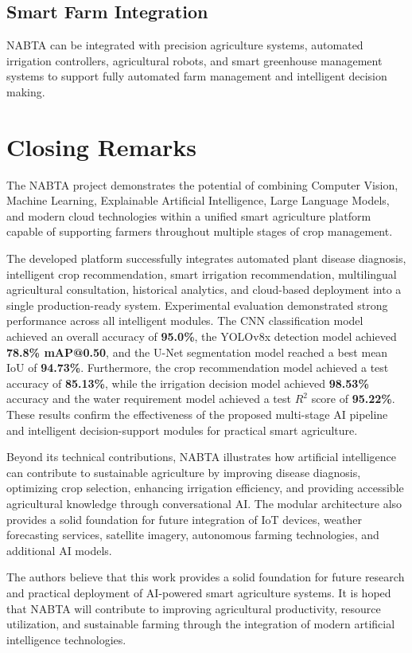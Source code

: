 \subsection{Smart Farm Integration}
\label{subsec:fw_farm}

NABTA can be integrated with precision agriculture systems, automated irrigation controllers, agricultural robots, and smart greenhouse management systems to support fully automated farm management and intelligent decision making.

\section{Closing Remarks}
\label{sec:closing}

The NABTA project demonstrates the potential of combining Computer Vision, Machine Learning, Explainable Artificial Intelligence, Large Language Models, and modern cloud technologies within a unified smart agriculture platform capable of supporting farmers throughout multiple stages of crop management.

The developed platform successfully integrates automated plant disease diagnosis, intelligent crop recommendation, smart irrigation recommendation, multilingual agricultural consultation, historical analytics, and cloud-based deployment into a single production-ready system. Experimental evaluation demonstrated strong performance across all intelligent modules. The CNN classification model achieved an overall accuracy of \textbf{95.0\%}, the YOLOv8x detection model achieved \textbf{78.8\% mAP@0.50}, and the U-Net segmentation model reached a best mean IoU of \textbf{94.73\%}. Furthermore, the crop recommendation model achieved a test accuracy of \textbf{85.13\%}, while the irrigation decision model achieved \textbf{98.53\%} accuracy and the water requirement model achieved a test $R^2$ score of \textbf{95.22\%}. These results confirm the effectiveness of the proposed multi-stage AI pipeline and intelligent decision-support modules for practical smart agriculture.

Beyond its technical contributions, NABTA illustrates how artificial intelligence can contribute to sustainable agriculture by improving disease diagnosis, optimizing crop selection, enhancing irrigation efficiency, and providing accessible agricultural knowledge through conversational AI. The modular architecture also provides a solid foundation for future integration of IoT devices, weather forecasting services, satellite imagery, autonomous farming technologies, and additional AI models.

The authors believe that this work provides a solid foundation for future research and practical deployment of AI-powered smart agriculture systems. It is hoped that NABTA will contribute to improving agricultural productivity, resource utilization, and sustainable farming through the integration of modern artificial intelligence technologies.
